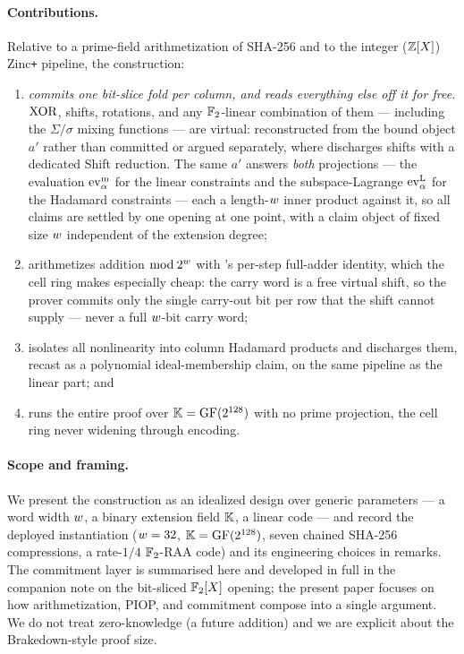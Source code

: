 \paragraph{Contributions.} Relative to a prime-field arithmetization of
SHA-256 and to the integer ($\mathbb{Z}[X]$) Zinc\texttt{+} pipeline, the
construction:
\begin{enumerate}[leftmargin=2em]
  \item \emph{commits one bit-slice fold per column, and reads everything
    else off it for free.} $\operatorname{XOR}$, shifts, rotations, and any
    $\mathbb{F}_2$-linear combination of them --- including the $\Sigma/\sigma$
    mixing functions --- are virtual: reconstructed from the bound object
    $a'$ rather than committed or argued separately, where \binius{}
    discharges shifts with a dedicated Shift reduction. The same $a'$
    answers \emph{both} projections --- the evaluation $\operatorname{ev}^{\mathrm{m}}_{\alpha}$ for the
    linear constraints and the subspace-Lagrange $\operatorname{ev}^{\mathrm{L}}_{\alpha}$ for the Hadamard
    constraints --- each a length-$w$ inner product against it, so all
    claims are settled by one opening at one point, with a claim object of
    fixed size $w$ independent of the extension degree;
  \item arithmetizes addition $\bmod\,2^{w}$ with \binius{}'s per-step
    full-adder identity, which the cell ring makes especially cheap: the
    carry word is a free virtual shift, so the prover commits only the
    single carry-out bit per row that the shift cannot supply --- never a
    full $w$-bit carry word;
  \item isolates all nonlinearity into column Hadamard products and
    discharges them, recast as a polynomial ideal-membership claim, on the
    same pipeline as the linear part; and
  \item runs the entire proof over $\mathbb{K}=\mathrm{GF}(2^{128})$ with no prime
    projection, the cell ring never widening through encoding.
\end{enumerate}

\paragraph{Scope and framing.} We present the construction as an
idealized design over generic parameters --- a word width $w$, a
binary extension field $\mathbb{K}$, a linear code --- and record the deployed
instantiation ($w=32$, $\mathbb{K}=\mathrm{GF}(2^{128})$, seven chained
SHA-256 compressions, a rate-$1/4$ $\mathbb{F}_2$-RAA code) and its engineering
choices in remarks. The commitment layer is summarised here and
developed in full in the companion note on the bit-sliced $\mathbb{F}_2[X]$
opening; the present paper focuses on how arithmetization, PIOP, and
commitment compose into a single argument. We do not treat
zero-knowledge (a future addition) and we are explicit about the
Brakedown-style proof size.

